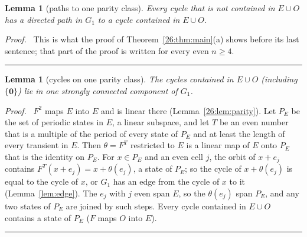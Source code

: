 \documentclass[10pt,a4paper]{article}
\newtheorem{lemma}[theorem]{Lemma}
\newcommand{\qedmark}{\rule{1.1ex}{1.1ex}}
\newenvironment{proof}[1][Proof]{\par\smallskip\noindent\textit{#1.}\ }{\hfill\qedmark\par\smallskip}
\newcommand{\zero}{\mathbf{0}}                %
\newcommand{\Gone}{G_1}                       %
\begin{document}
\begin{lemma}[paths to one parity class]\label{26:lem:topar}
Every cycle that is not contained in $E\cup O$ has a directed path in $\Gone$ to a cycle contained in $E\cup O$.
\end{lemma}
\begin{proof}
This is what the proof of Theorem~\ref{26:thm:main}(a) shows before its last sentence; that part of the proof is
written for every even $n\ge4$.
\end{proof}

\begin{lemma}[cycles on one parity class]\label{26:lem:oneparity}
The cycles contained in $E\cup O$ (including $\{\zero\}$) lie in one strongly connected component of $\Gone$.
\end{lemma}
\begin{proof}
$F^2$ maps $E$ into $E$ and is linear there (Lemma~\ref{26:lem:parity}). Let $P_E$ be the set of periodic states in
$E$, a linear subspace, and let $T$ be an even number that is a multiple of the period of every state of $P_E$ and
at least the length of every transient in $E$. Then $\theta=F^T$ restricted to $E$ is a linear map of $E$ onto
$P_E$ that is the identity on $P_E$. For $x\in P_E$ and an even cell $j$, the orbit of $x+e_j$ contains
$F^T(x+e_j)=x+\theta(e_j)$, a state of $P_E$; so the cycle of $x+\theta(e_j)$ is equal to the cycle of $x$, or
$\Gone$ has an edge from the cycle of $x$ to it (Lemma~\ref{lem:edge}). The $e_j$ with $j$ even span $E$, so the
$\theta(e_j)$ span $P_E$, and any two states of $P_E$ are joined by such steps. Every cycle contained in $E\cup O$
contains a state of $P_E$ ($F$ maps $O$ into $E$).
\end{proof}
\end{document}
